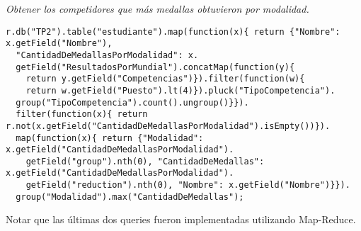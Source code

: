 \emph{Obtener los competidores que más medallas obtuvieron por modalidad.}
\begin{lstlisting}[language=rethinkDBnoSQL]
r.db("TP2").table("estudiante").map(function(x){ return {"Nombre": x.getField("Nombre"), 
  "CantidadDeMedallasPorModalidad": x.
  getField("ResultadosPorMundial").concatMap(function(y){
    return y.getField("Competencias")}).filter(function(w){
    return w.getField("Puesto").lt(4)}).pluck("TipoCompetencia").
  group("TipoCompetencia").count().ungroup()}}).
  filter(function(x){ return r.not(x.getField("CantidadDeMedallasPorModalidad").isEmpty())}).
  map(function(x){ return {"Modalidad": x.getField("CantidadDeMedallasPorModalidad").
    getField("group").nth(0), "CantidadDeMedallas": x.getField("CantidadDeMedallasPorModalidad").
    getField("reduction").nth(0), "Nombre": x.getField("Nombre")}}).
  group("Modalidad").max("CantidadDeMedallas");
\end{lstlisting}

Notar que las últimas dos queries fueron implementadas utilizando Map-Reduce.
